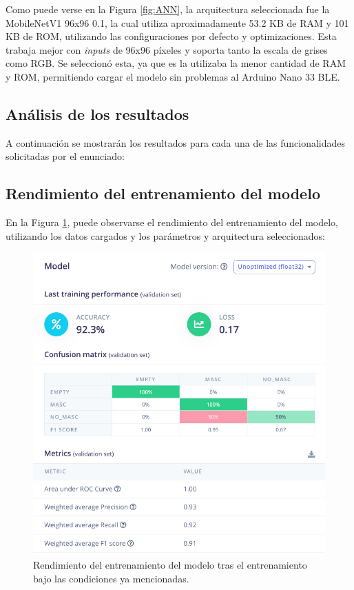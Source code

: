 Como puede verse en la Figura \ref{fig:ANN}, la arquitectura seleccionada fue la MobileNetV1 96x96 0.1, la cual utiliza aproximadamente 53.2 KB de RAM y 101 KB de ROM, utilizando las configuraciones por defecto y optimizaciones. Esta trabaja mejor con \textit{inputs} de 96x96 píxeles y soporta tanto la escala de grises como RGB. Se seleccionó esta, ya que es la utilizaba la menor cantidad de RAM y ROM, permitiendo cargar el modelo sin problemas al Arduino Nano 33 BLE. 

\subsection{Análisis de los resultados}
 A continuación se mostrarán los resultados para cada una de las funcionalidades solicitadas por el enunciado: 

\subsection{Rendimiento del entrenamiento del modelo}
En la Figura \ref{fig:RM}, puede observarse el rendimiento del entrenamiento del modelo, utilizando los datos cargados y los parámetros y arquitectura seleccionados: 

\begin{figure}[H]
\centering
\includegraphics[width=120mm]{./Figuras/Desarrollo_Analisis/RM}
\caption{Rendimiento del entrenamiento del modelo tras el entrenamiento bajo las condiciones ya mencionadas.} 
\label{fig:RM}
\end{figure}

